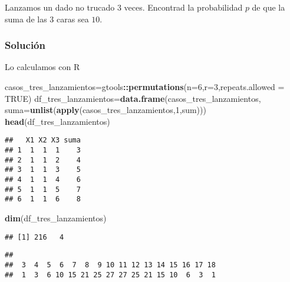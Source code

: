 \documentclass[
]{article}
\newenvironment{Shaded}{\begin{snugshade}}{\end{snugshade}}
\newcommand{\DataTypeTok}[1]{\textcolor[rgb]{0.13,0.29,0.53}{#1}}
\newcommand{\DecValTok}[1]{\textcolor[rgb]{0.00,0.00,0.81}{#1}}
\newcommand{\KeywordTok}[1]{\textcolor[rgb]{0.13,0.29,0.53}{\textbf{#1}}}
\newcommand{\NormalTok}[1]{#1}
\newcommand{\OperatorTok}[1]{\textcolor[rgb]{0.81,0.36,0.00}{\textbf{#1}}}
\newcommand{\OtherTok}[1]{\textcolor[rgb]{0.56,0.35,0.01}{#1}}
\begin{document}
Lanzamos un dado no trucado 3 veces. Encontrad la probabilidad \(p\) de
que la suma de las 3 caras sea \(10\).

\hypertarget{soluciuxf3n-10}{%
\subsubsection{Solución}\label{soluciuxf3n-10}}

Lo calculamos con R

\begin{Shaded}
\begin{Highlighting}[]
\NormalTok{casos_tres_lanzamientos=gtools}\OperatorTok{::}\KeywordTok{permutations}\NormalTok{(}\DataTypeTok{n=}\DecValTok{6}\NormalTok{,}\DataTypeTok{r=}\DecValTok{3}\NormalTok{,}\DataTypeTok{repeats.allowed =} \OtherTok{TRUE}\NormalTok{)}
\NormalTok{df_tres_lanzamientos=}\KeywordTok{data.frame}\NormalTok{(casos_tres_lanzamientos, }\DataTypeTok{suma=}\KeywordTok{unlist}\NormalTok{(}\KeywordTok{apply}\NormalTok{(casos_tres_lanzamientos,}\DecValTok{1}\NormalTok{,sum)))}
\KeywordTok{head}\NormalTok{(df_tres_lanzamientos)}
\end{Highlighting}
\end{Shaded}

\begin{verbatim}
##   X1 X2 X3 suma
## 1  1  1  1    3
## 2  1  1  2    4
## 3  1  1  3    5
## 4  1  1  4    6
## 5  1  1  5    7
## 6  1  1  6    8
\end{verbatim}

\begin{Shaded}
\begin{Highlighting}[]
\KeywordTok{dim}\NormalTok{(df_tres_lanzamientos)}
\end{Highlighting}
\end{Shaded}

\begin{verbatim}
## [1] 216   4
\end{verbatim}

\begin{Shaded}
\end{Shaded}

\begin{verbatim}
## 
##  3  4  5  6  7  8  9 10 11 12 13 14 15 16 17 18 
##  1  3  6 10 15 21 25 27 27 25 21 15 10  6  3  1
\end{verbatim}
\end{document}
